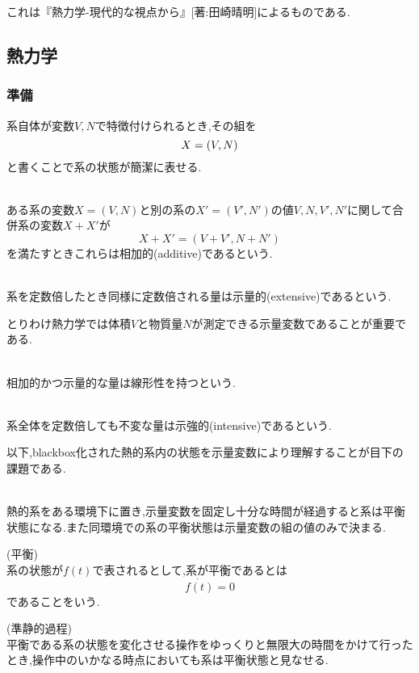 \documentclass[dvipdfmx,uplatex]{jsarticle}
\begin{document}
これは『熱力学-現代的な視点から』[著:田崎晴明]によるものである.
\subsection{熱力学}
\subsubsection{準備}
系自体が変数$V,N$で特徴付けられるとき,その組を
\[
X = (V,N) \\
\]
と書くことで系の状態が簡潔に表せる.
\begin{defi} \mbox{} \\
ある系の変数$X = (V,N)$と別の系の$X' = (V',N')$の値$V,N,V',N'$に関して合併系の変数$X+X'$が
\[
X + X' = (V+V', N+N') 
\]
を満たすときこれらは相加的(additive)であるという.
\end{defi}

\begin{defi} \mbox{} \\
系を定数倍したとき同様に定数倍される量は示量的(extensive)であるという.
\end{defi}
とりわけ熱力学では体積$V$と物質量$N$が測定できる示量変数であることが重要である.
\begin{cf} \mbox{} \\
相加的かつ示量的な量は線形性を持つという.
\end{cf}
\begin{defi} \mbox{} \\
系全体を定数倍しても不変な量は示強的(intensive)であるという.
\end{defi}


以下,blackbox化された熱的系内の状態を示量変数により理解することが目下の課題である.

\begin{law} \mbox{} \\
熱的系をある環境下に置き,示量変数を固定し十分な時間が経過すると系は平衡状態になる.また同環境での系の平衡状態は示量変数の組の値のみで決まる.
\end{law}
\begin{defi} (平衡) \\
系の状態が$f(t)$で表されるとして,系が平衡であるとは \\
\[
\dot{f(t)} = 0
\]
であることをいう.
\end{defi}

\begin{theo} (準静的過程)\\
平衡である系の状態を変化させる操作をゆっくりと無限大の時間をかけて行ったとき,操作中のいかなる時点においても系は平衡状態と見なせる.
\end{theo}
\end{document}
